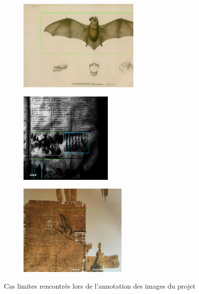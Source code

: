 	\begin{figure}[h]
		\begin{subfigure}{0.37\linewidth}
			\centering
			\includegraphics[height=4.5cm]{images/vhs_edge_case1.png}
		\end{subfigure}
		\hspace{1pt}
		\begin{subfigure}{0.30\linewidth}
			\centering
			\includegraphics[height=4.5cm]{images/vhs_edge_case2.png}
		\end{subfigure}
		\hspace{1pt}
		\begin{subfigure}{0.25\linewidth}
			\centering
			\includegraphics[height=4.5cm]{images/vhs_edge_case3.png}
		\end{subfigure}
		\caption{Cas limites rencontrés lors de l'annotation des images du projet \vhs}
		\label{fig:edge_cases_vhs}
	\end{figure}

